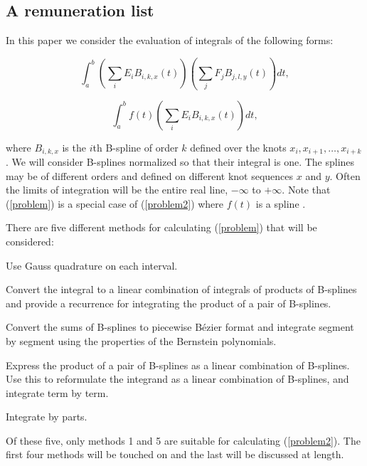\documentclass[final,leqno,onetabnum]{siamltex0315}
\begin{document}
\subsection{A remuneration list}
In this paper we consider the evaluation of integrals of the 
following forms:
\begin{linenomath*}
\begin{equation}
\int_a^b \left( \sum_i E_i B_{i,k,x}(t) \right)
         \left( \sum_j F_j B_{j,l,y}(t) \right) dt,\label{problem}
\end{equation}
\end{linenomath*}
\begin{linenomath*}
\begin{equation}
\int_a^b f(t) \left( \sum_i E_i B_{i,k,x}(t) \right) dt,\label{problem2}
\end{equation}
\end{linenomath*}
where $B_{i,k,x}$ is the $i$th B-spline of order $k$ defined over the
knots $x_i, x_{i+1}, \ldots, x_{i+k}$.
We will consider B-splines normalized so that their integral is one.
The splines may be of different orders and
defined on different knot sequences $x$ and $y$.
Often the limits of integration will be the entire real line, $-\infty$
to $+\infty$. Note that (\ref{problem}) is a special case of (\ref{problem2})
where $f(t)$ is a spline \cite{BDM}.


There are five different methods for calculating (\ref{problem})
that will be considered:
\begin{remunerate}
\item Use Gauss quadrature on each interval.
\item Convert the integral to a linear combination of
      integrals of products of B-splines and provide a recurrence for
      integrating the product of a pair of B-splines.
\item Convert the sums of B-splines to piecewise
      B\'{e}zier format and integrate segment
      by segment using the properties of the Bernstein polynomials.
\item Express the product of a pair of B-splines as a linear combination
      of B-splines.
      Use this to reformulate the integrand as a linear combination
      of B-splines, and integrate term by term.
\item Integrate by parts.
\end{remunerate}
Of these five, only methods 1 and 5 are suitable for calculating 
(\ref{problem2}). The first four methods will be touched on and the 
last will be discussed at length.
\end{document}
